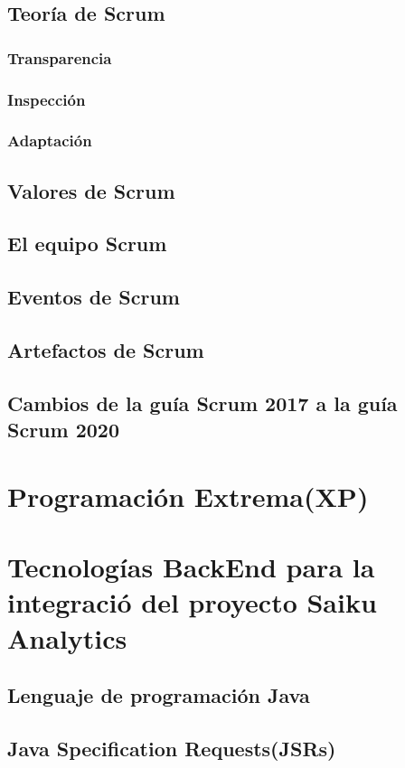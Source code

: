	\subsection{Teor\'{i}a de Scrum}
		\subsubsection{Transparencia}
		\subsubsection{Inspecci\'{o}n}
		\subsubsection{Adaptaci\'{o}n}
	\subsection{Valores de Scrum}
	\subsection{El equipo Scrum}
	\subsection{Eventos de Scrum}
	\subsection{Artefactos de Scrum}
	\subsection{Cambios de la gu\'{i}a Scrum 2017 a la gu\'{i}a Scrum 2020}

\section{Programaci\'{o}n Extrema(XP)}
		\lipsum[1-2]
\section{Tecnolog\'{i}as BackEnd para la integraci\'{o} del proyecto Saiku Analytics}
		\lipsum[1-2]
	\subsection{Lenguaje de programaci\'{o}n Java}
			\lipsum[1-2]
	\subsection{Java Specification Requests(JSRs)}
